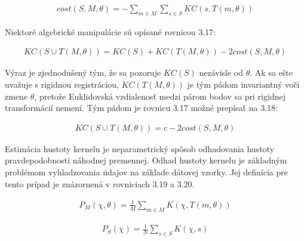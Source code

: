 \begin{equation}
\label{eq16}
\begin{aligned}
cost\left(S,M,\theta\right)= - \sum_{m\in M} \sum_{s\in S} KC \left(s, T\left(m, \theta \right)\right)
\end{aligned}
\end{equation}

Niektoré algebrické manipulácie sú opísané rovnicou 3.17:

\begin{equation}
\label{eq17}
\begin{aligned}
KC\left(S\cup T\left(M,\theta\right)\right) = KC\left(S\right) + KC\left(T \left(M, \theta \right)\right) - 2cost\left(S,M,\theta \right)
\end{aligned}
\end{equation}

Výraz je zjednodušený tým, že sa pozoruje $KC\left(S\right)$ nezávisle od $\theta$. Ak sa ešte uvažuje s rigidnou registráciou, $KC\left(T \left(M, \theta \right)\right)$ je tým pádom invariantný voči zmene $\theta$, pretože Euklidovská vzdialenosť medzi párom bodov sa pri rigidnej transformácií nemení. Tým pádom je rovnicu 3.17 možné prepísať na 3.18:

\begin{equation}
\label{eq18}
\begin{aligned}
KC\left(S\cup T\left(M,\theta\right)\right) = c - 2cost\left(S,M,\theta \right)
\end{aligned}
\end{equation}


Estimácia hustoty kernelu je neparametrický spôsob odhadovania hustoty pravdepodobnosti náhodnej premennej. Odhad hustoty kernelu je základným problémom vyhladzovania údajov na základe dátovej vzorky. Jej definícia pre tento prípad je znázornená v rovniciach 3.19 a 3.20.

\begin{equation}
\label{eq19}
\begin{aligned}
P_M\left( \chi,\theta\right)=\frac{1}{M}\sum_{m\in M} K\left(\chi,T\left(m,\theta\right)\right)
\end{aligned}
\end{equation}

\begin{equation}
\label{eq20}
\begin{aligned}
P_S\left( \chi\right)=\frac{1}{N}\sum_{s\in S} K\left(\chi,s\right)
\end{aligned}
\end{equation}


